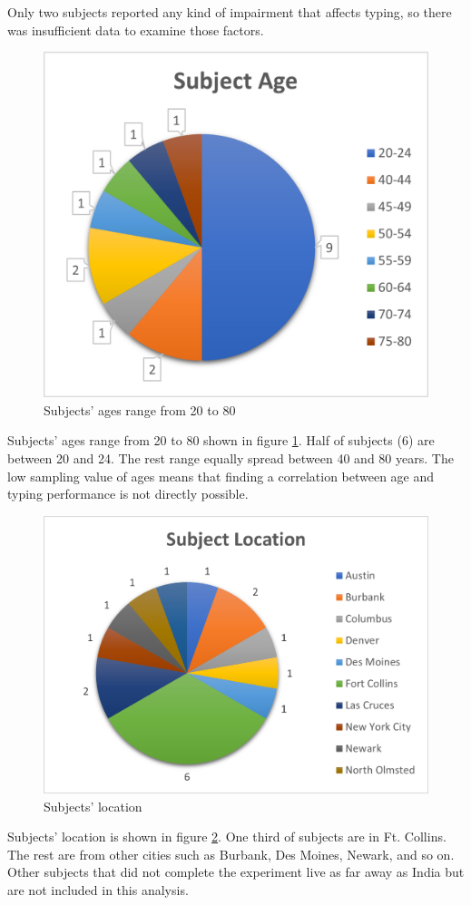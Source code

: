 \documentclass[english]{vgtc}
\begin{document}
Only two subjects reported any kind of impairment that affects typing, so there
was insufficient data to examine those factors.

\begin{figure}[!htb]
  \centering
  \includegraphics[width=0.95\columnwidth]{subject-age.png}
  \caption{Subjects' ages range from 20 to 80}
  \label{fig:age}
\end{figure}
Subjects' ages range from 20 to 80 shown in figure \ref{fig:age}. Half of subjects (6) are between 20 and 24. The rest range equally spread between 40 and 80 years. 
The low sampling value of ages means that finding a correlation between age and typing performance is not
directly possible.

\begin{figure}[!htb]
  \centering
  \includegraphics[width=0.95\columnwidth]{subject-location.png}
  \caption{Subjects' location}
  \label{fig:location}
\end{figure}
Subjects' location is shown in figure \ref{fig:location}. One third of subjects are in Ft. Collins.
The rest are from other cities such as Burbank, Des Moines, Newark, and so on.  Other subjects
that did not complete the experiment live as far away as India but are not included in this analysis.
\end{document}
